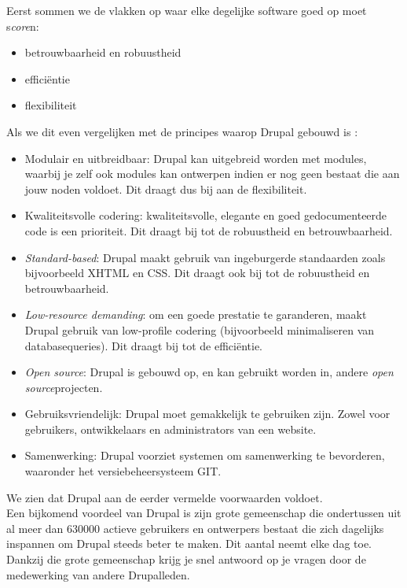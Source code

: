 Eerst sommen we de vlakken op waar elke degelijke software goed op moet s\textit{core}n:
\begin{itemize}
\item betrouwbaarheid en robuustheid
\item effici\"{e}ntie
\item flexibiliteit
\end{itemize}
Als we dit even vergelijken met de principes waarop Drupal gebouwd is \cite{drupalMission}:
\begin{itemize}
\item Modulair en uitbreidbaar: Drupal kan uitgebreid worden met modules, waarbij je zelf ook modules kan ontwerpen indien er nog geen bestaat die aan jouw noden voldoet. Dit draagt dus bij aan de flexibiliteit.
\item Kwaliteitsvolle codering: kwaliteitsvolle, elegante en goed gedocumenteerde code is een prioriteit. Dit draagt bij tot de robuustheid en betrouwbaarheid.
\item \textit{Standard-based}: Drupal maakt gebruik van ingeburgerde standaarden zoals bijvoorbeeld XHTML en CSS. Dit draagt ook bij tot de robuustheid en betrouwbaarheid.
\item \textit{Low-resource demanding}: om een goede prestatie te garanderen, maakt Drupal gebruik van low-profile codering (bijvoorbeeld minimaliseren van databasequeries). Dit draagt bij tot de effici\"{e}ntie.
\item \textit{Open source}: Drupal is gebouwd op, en kan gebruikt worden in, andere \textit{open source}projecten.
\item Gebruiksvriendelijk: Drupal moet gemakkelijk te gebruiken zijn. Zowel voor gebruikers, ontwikkelaars en administrators van een website.
\item Samenwerking: Drupal voorziet systemen om samenwerking te bevorderen, waaronder het versiebeheersysteem GIT.
\end{itemize}
We zien dat Drupal aan de eerder vermelde voorwaarden voldoet.\\

\noindent
Een bijkomend voordeel van Drupal is zijn grote gemeenschap die ondertussen uit al meer dan 630000 actieve gebruikers en ontwerpers bestaat die zich dagelijks inspannen om Drupal steeds beter te maken. Dit aantal neemt elke dag toe. Dankzij die grote gemeenschap krijg je snel antwoord op je vragen door de medewerking van andere Drupalleden.\\

